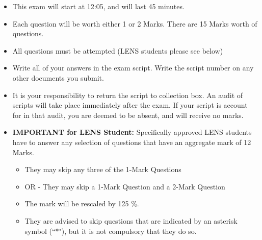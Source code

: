 \documentclass[a4paper,12pt]{article}
\begin{document}
	\begin{itemize} 
		\item This exam will start at 12:05, and will last 45 minutes.
		
		\item Each question will be worth either 1 or 2 Marks. There are 15 Marks worth of questions.
		\item All questions must be attempted (LENS students please see below)
		
		\item Write all of your answers in the exam script. Write the script number on any other documents you submit.
		
		\item It is your responsibility to return the script to collection box. An audit of scripts will take place immediately after the exam. If your script is account for in that audit,  you are deemed to be absent, and will receive no marks.
		
		\item \textbf{IMPORTANT for LENS Student:}
		Specifically approved LENS students have to answer any selection of questions that have an aggregate mark of 12 Marks.  
		\begin{itemize}
			\item They may skip any three of the 1-Mark Questions
			\item OR - They may skip a 1-Mark Question and a 2-Mark Question
			\item The mark will be rescaled by 125 \%.
			\item They are advised to skip questions that are indicated by an asterisk symbol (``$\ast$"), but it is not compulsory that they do so.
		\end{itemize}
		
		
	\end{itemize}
	\newpage
\end{document}
